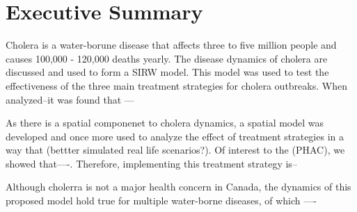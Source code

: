 \documentclass[12pt]{article}\usepackage[]{graphicx}\usepackage[]{color}
\begin{document}
\section{Executive Summary}
\par Cholera is a water-borune disease that affects three to five million people and causes 100,000 - 120,000 deaths yearly. The disease dynamics of cholera are discussed and used to form a SIRW model. This model was used to test the effectiveness of the three main treatment strategies for cholera outbreaks. When analyzed--it was found that ---\\
\par As there is a spatial componenet to cholera dynamics, a spatial model was developed and once more used to analyze the effect of treatment strategies in a way that (bettter simulated real life scenarios?). Of interest to the (PHAC), we showed that----. 
Therefore, implementing this treatment strategy is--\\
\par Although cholerra is not a major health concern in Canada, the dynamics of this proposed model hold true for multiple water-borne diseases, of which ----
\end{document}
